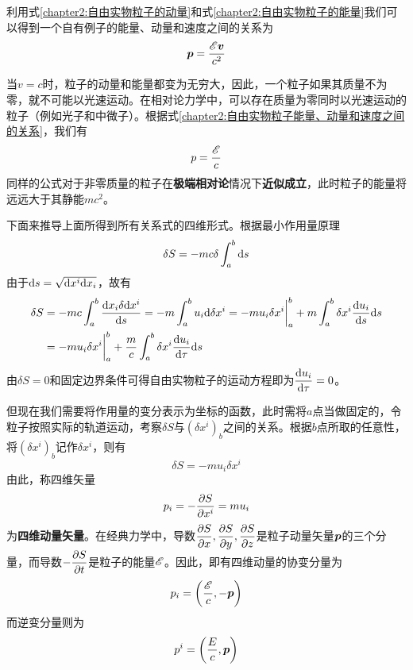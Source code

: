 利用式\eqref{chapter2:自由实物粒子的动量}和式\eqref{chapter2:自由实物粒子的能量}我们可以得到一个自有例子的能量、动量和速度之间的关系为
\begin{equation}
	\boldsymbol{p} = \frac{\mathscr{E} \boldsymbol{v}}{c^2}
	\label{chapter2:自由实物粒子能量、动量和速度之间的关系}
\end{equation}

当$v=c$时，粒子的动量和能量都变为无穷大，因此，一个粒子如果其质量不为零，就不可能以光速运动。在相对论力学中，可以存在质量为零同时以光速运动的粒子（例如光子和中微子）。根据式\eqref{chapter2:自由实物粒子能量、动量和速度之间的关系}，我们有
\begin{equation}
	p = \frac{\mathscr{E}}{c}
\end{equation}
同样的公式对于非零质量的粒子在{\bf 极端相对论}情况下{\bf 近似成立}，此时粒子的能量将远远大于其静能$mc^2$。

下面来推导上面所得到所有关系式的四维形式。根据最小作用量原理
\begin{equation*}
	\delta S = -mc\delta\int_a^b \mathrm{d} s
\end{equation*}
由于$\mathrm{d} s = \sqrt{\mathrm{d} x^i\mathrm{d} x_i}$，故有
\begin{align*}
	\delta S & = -mc\int_a^b \frac{\mathrm{d} x_i\delta \mathrm{d} x^i}{\mathrm{d} s} = -m\int_a^b u_i\mathrm{d} \delta x^i = -mu_i\delta x^i\bigg|_a^b + m\int_a^b \delta x^i \frac{\mathrm{d} u_i}{\mathrm{d} s}\mathrm{d} s \\
	& = -mu_i\delta x^i\bigg|_a^b + \frac{m}{c}\int_a^b \delta x^i \frac{\mathrm{d} u_i}{\mathrm{d} \tau}\mathrm{d} s
\end{align*}
由$\delta S = 0$和固定边界条件可得自由实物粒子的运动方程即为$\dfrac{\mathrm{d} u_i}{\mathrm{d} \tau} = 0$。

但现在我们需要将作用量的变分表示为坐标的函数，此时需将$a$点当做固定的，令粒子按照实际的轨道运动，考察$\delta S$与$(\delta x^i)_b$之间的关系。根据$b$点所取的任意性，将$(\delta x^i)_b$记作$\delta x^i$，则有
\begin{equation}
	\delta S = -mu_i\delta x^i
\end{equation}
由此，称四维矢量
\begin{equation}
	p_i = -\frac{\partial S}{\partial x^i} = mu_i
	\label{chapter2:四维动量矢量}
\end{equation}
为{\bf 四维动量矢量}。在经典力学中，导数$\dfrac{\partial S}{\partial x}, \dfrac{\partial S}{\partial y}, \dfrac{\partial S}{\partial z}$是粒子动量矢量$\boldsymbol{p}$的三个分量，而导数$-\dfrac{\partial S}{\partial t}$是粒子的能量$\mathscr{E}$。因此，即有四维动量的协变分量为
\begin{equation}
	p_i = \left(\frac{\mathscr{E}}{c},-\boldsymbol{p}\right)
	\label{chapter2:四维动量矢量的协变分量}
\end{equation}
而逆变分量则为
\begin{equation}
	p^i = \left(\frac{E}{c},\boldsymbol{p}\right)
	\label{chapter2:四维动量矢量的逆变分量}
\end{equation}

